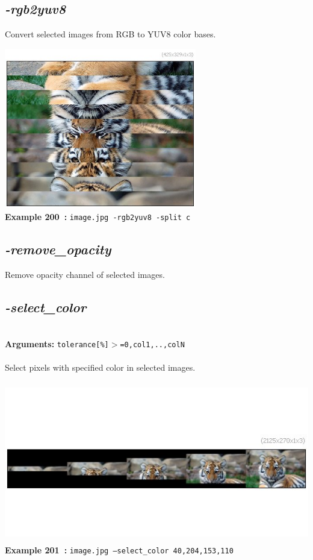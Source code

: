 \documentclass[a4paper,11pt,twoside]{book}
\begin{document}
\subsection{\emph{-rgb2yuv8} }\vspace*{-0.5em}
Convert selected images from RGB to YUV8 color bases.
\begin{center}\includegraphics[keepaspectratio=true,height=7cm,width=\textwidth]{img/gmic_def200.jpg}\\
{\footnotesize \textbf{Example 200~:} \texttt{image.jpg -rgb2yuv8 -split c}}
\end{center}

\subsection{\emph{-remove\_opacity} }\vspace*{-0.5em}
Remove opacity channel of selected images.


\subsection{\emph{-select\_color} }\vspace*{-0.5em}
~\\\textbf{Arguments: } 
{\small \texttt{tolerance[\%]$>$=0,col1,..,colN}}\\~\\
Select pixels with specified color in selected images.
\begin{center}\includegraphics[keepaspectratio=true,height=7cm,width=\textwidth]{img/gmic_def201.jpg}\\
{\footnotesize \textbf{Example 201~:} \texttt{image.jpg --select\_color 40,204,153,110}}
\end{center}
\end{document}
